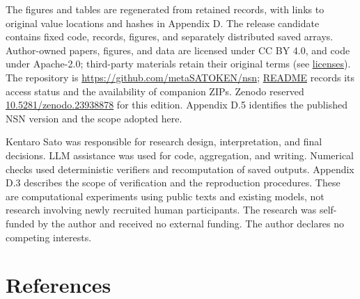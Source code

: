 \documentclass[10pt,a4paper]{article}
\begin{document}
The figures and tables are regenerated from retained records, with links to original value locations and hashes in Appendix D. The release candidate contains fixed code, records, figures, and separately distributed saved arrays. Author-owned papers, figures, and data are licensed under CC BY 4.0, and code under Apache-2.0; third-party materials retain their original terms (see \href{https://github.com/metaSATOKEN/nsn/blob/c37d39ea0106274d9f661cfbb268b0ed05319846/LICENSES.md}{licenses}). The repository is \url{https://github.com/metaSATOKEN/nsn}; \href{https://github.com/metaSATOKEN/nsn/blob/c37d39ea0106274d9f661cfbb268b0ed05319846/README.md}{README} records its access status and the availability of companion ZIPs. Zenodo reserved \href{https://doi.org/10.5281/zenodo.23938878}{10.5281/zenodo.23938878} for this edition. Appendix D.5 identifies the published NSN version and the scope adopted here.

Kentaro Sato was responsible for research design, interpretation, and final decisions. LLM assistance was used for code, aggregation, and writing. Numerical checks used deterministic verifiers and recomputation of saved outputs. Appendix D.3 describes the scope of verification and the reproduction procedures. These are computational experiments using public texts and existing models, not research involving newly recruited human participants. The research was self-funded by the author and received no external funding. The author declares no competing interests.

\clearpage

\begingroup\raggedright\section{References}\label{references}
\end{document}
